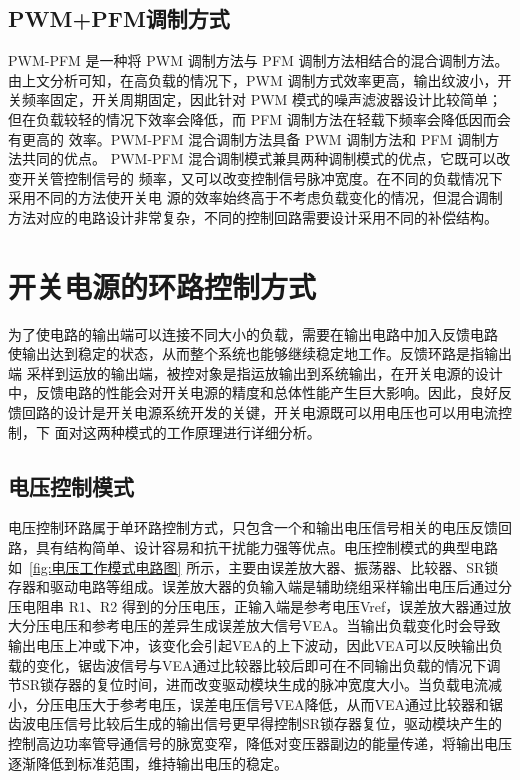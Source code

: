 \subsection{PWM+PFM调制方式}
PWM-PFM 是一种将 PWM 调制方法与 PFM 调制方法相结合的混合调制方法。 由上文分析可知，在高负载的情况下，PWM 调制方式效率更高，输出纹波小，开关频率固定，开关周期固定，因此针对 PWM 模式的噪声滤波器设计比较简单；但在负载较轻的情况下效率会降低，而 PFM 调制方法在轻载下频率会降低因而会有更高的 效率。PWM-PFM 混合调制方法具备 PWM 调制方法和 PFM 调制方法共同的优点。 PWM-PFM 混合调制模式兼具两种调制模式的优点，它既可以改变开关管控制信号的 频率，又可以改变控制信号脉冲宽度。在不同的负载情况下采用不同的方法使开关电 源的效率始终高于不考虑负载变化的情况，但混合调制方法对应的电路设计非常复杂，不同的控制回路需要设计采用不同的补偿结构。

\section{开关电源的环路控制方式}
为了使电路的输出端可以连接不同大小的负载，需要在输出电路中加入反馈电路 使输出达到稳定的状态，从而整个系统也能够继续稳定地工作。反馈环路是指输出端 采样到运放的输出端，被控对象是指运放输出到系统输出，在开关电源的设计中，反馈电路的性能会对开关电源的精度和总体性能产生巨大影响。因此，良好反馈回路的设计是开关电源系统开发的关键，开关电源既可以用电压也可以用电流控制，下 面对这两种模式的工作原理进行详细分析。

\subsection{电压控制模式}
电压控制环路属于单环路控制方式，只包含一个和输出电压信号相关的电压反馈回路，具有结构简单、设计容易和抗干扰能力强等优点。电压控制模式的典型电路如~\ref{fig:电压工作模式电路图} 所示，主要由误差放大器、振荡器、比较器、SR锁存器和驱动电路等组成。误差放大器的负输入端是辅助绕组采样输出电压后通过分压电阻串 R1、R2 得到的分压电压，正输入端是参考电压Vref，误差放大器通过放大分压电压和参考电压的差异生成误差放大信号VEA。当输出负载变化时会导致输出电压上冲或下冲，该变化会引起VEA的上下波动，因此VEA可以反映输出负载的变化，锯齿波信号与VEA通过比较器比较后即可在不同输出负载的情况下调节SR锁存器的复位时间，进而改变驱动模块生成的脉冲宽度大小。当负载电流减小，分压电压大于参考电压，误差电压信号VEA降低，从而VEA通过比较器和锯齿波电压信号比较后生成的输出信号更早得控制SR锁存器复位，驱动模块产生的控制高边功率管导通信号的脉宽变窄，降低对变压器副边的能量传递，将输出电压逐渐降低到标准范围，维持输出电压的稳定。


